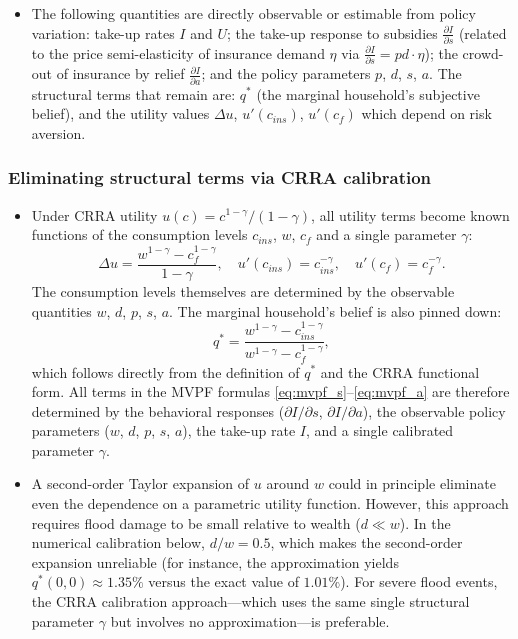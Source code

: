 \documentclass[12pt]{article}
\begin{document}
\begin{itemize}
\begin{enumerate}
    \end{enumerate}
    The denominator captures the net fiscal cost, which includes a \emph{fiscal externality}: when a household switches from uninsured to insured (or vice versa), it moves between costing $a \cdot pd$ in relief and $s \cdot pd$ in subsidy, changing the government's expenditure by $(s-a)pd$ per switcher. At an interior optimum, $\text{MVPF}_s = \text{MVPF}_a = \lambda$. At a corner (e.g.\ $a=0$), the unused instrument has a lower MVPF.
    \item The following quantities are directly observable or estimable from policy variation: take-up rates $I$ and $U$; the take-up response to subsidies $\frac{\partial I}{\partial s}$ (related to the price semi-elasticity of insurance demand $\eta$ via $\frac{\partial I}{\partial s} = pd \cdot \eta$); the crowd-out of insurance by relief $\frac{\partial I}{\partial a}$; and the policy parameters $p$, $d$, $s$, $a$. The structural terms that remain are: $q^*$ (the marginal household's subjective belief), and the utility values $\Delta u$, $u'(c_{ins})$, $u'(c_f)$ which depend on risk aversion.
\end{itemize}

\subsubsection*{Eliminating structural terms via CRRA calibration}
\begin{itemize}
    \item Under CRRA utility $u(c) = c^{1-\gamma}/(1-\gamma)$, all utility terms become known functions of the consumption levels $c_{ins}$, $w$, $c_f$ and a single parameter $\gamma$: 
    \[
    \Delta u = \frac{w^{1-\gamma} - c_f^{1-\gamma}}{1-\gamma}, \quad u'(c_{ins}) = c_{ins}^{-\gamma}, \quad u'(c_f) = c_f^{-\gamma}.
    \]
    The consumption levels themselves are determined by the observable quantities $w$, $d$, $p$, $s$, $a$. The marginal household's belief is also pinned down:
    \[
    q^* = \frac{w^{1-\gamma} - c_{ins}^{1-\gamma}}{w^{1-\gamma} - c_f^{1-\gamma}},
    \]
    which follows directly from the definition of $q^*$ and the CRRA functional form. All terms in the MVPF formulas \eqref{eq:mvpf_s}--\eqref{eq:mvpf_a} are therefore determined by the behavioral responses ($\partial I / \partial s$, $\partial I / \partial a$), the observable policy parameters ($w$, $d$, $p$, $s$, $a$), the take-up rate $I$, and a single calibrated parameter $\gamma$.
    \item A second-order Taylor expansion of $u$ around $w$ could in principle eliminate even the dependence on a parametric utility function. However, this approach requires flood damage to be small relative to wealth ($d \ll w$). In the numerical calibration below, $d/w = 0.5$, which makes the second-order expansion unreliable (for instance, the approximation yields $q^*(0,0) \approx 1.35\%$ versus the exact value of $1.01\%$). For severe flood events, the CRRA calibration approach---which uses the same single structural parameter $\gamma$ but involves no approximation---is preferable.
\end{itemize}
\end{document}
